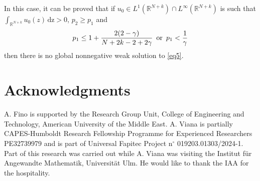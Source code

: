 \documentclass[reqno,11pt]{amsart}
\numberwithin{equation}{section}
\def\R{{\mathbb {R}}}
\def\R{\mathbb{R}}
\begin{document}

In this case, it can be proved that if $u_0\in L^1(\R^{N+k})\cap L^\infty(\R^{N+k})$ is such that $\displaystyle \int_{\R^{N+k}}u_0(z)\,\mathrm{dz}>0$, $p_2\geq p_1$ and
$$p_1\leq 1+\frac{2(2-\gamma)}{N+2k-2+2\gamma}\,\,\,\hbox{or}\,\,\,p_1<\frac{1}{\gamma}
$$
then there is no global nonnegative weak solution to \eqref{eq5}.



\section*{Acknowledgments}

A. Fino is supported by the Research Group Unit, College of Engineering and Technology, American University of the Middle East. A. Viana is partially CAPES-Humboldt Research Fellowship Programme for Experienced Researchers PE32739979 and is part of Universal Fapitec Project n$^{\circ}$ 019203.01303/2024-1. Part of this research was carried out while A. Viana was visiting the Institut f\"ur Angewandte Mathematik, Universit\"at Ulm. He would like to thank the IAA for the hospitality.



	
	
	
	
	
	
	
\end{document}
